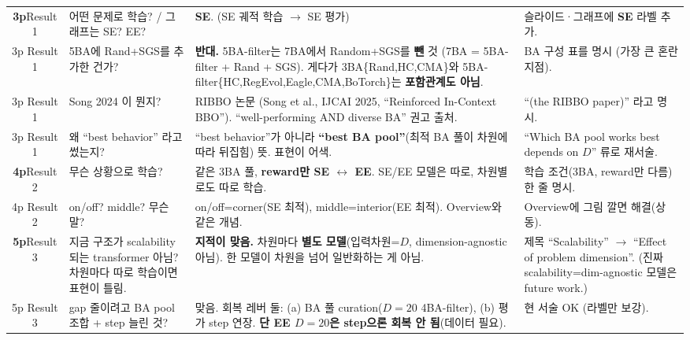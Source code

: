 \documentclass[10pt]{article}
\begin{document}
\begin{longtable}{S Q A F}
\textbf{3p}\newline Result 1 & 어떤 문제로 학습? / 그래프는 SE? EE? & \textbf{SE}. (SE 궤적 학습 $\to$ SE 평가) & 슬라이드·그래프에 \textbf{SE} 라벨 추가. \\
3p Result 1 & 5BA에 Rand+SGS를 추가한 건가? & \textcolor{flag}{\textbf{반대.}} 5BA-filter는 7BA에서 Random+SGS를 \textbf{뺀} 것 (7BA = 5BA-filter + Rand + SGS). 게다가 3BA\{Rand,HC,CMA\}와 5BA-filter\{HC,RegEvol,Eagle,CMA,BoTorch\}는 \textbf{포함관계도 아님}. & \textcolor{flag}{BA 구성 표를 명시} (가장 큰 혼란 지점). \\
3p Result 1 & Song 2024 이 뭔지? & RIBBO 논문 (Song et al., IJCAI 2025, ``Reinforced In-Context BBO''). ``well-performing AND diverse BA'' 권고 출처. & ``(the RIBBO paper)'' 라고 명시. \\
3p Result 1 & 왜 ``best behavior'' 라고 썼는지? & ``best behavior''가 아니라 \textbf{``best BA pool''}(최적 BA 풀이 차원에 따라 뒤집힘) 뜻. 표현이 어색. & ``Which BA pool works best depends on $D$'' 류로 재서술. \\
\midrule

\textbf{4p}\newline Result 2 & 무슨 상황으로 학습? & 같은 3BA 풀, \textbf{reward만 SE $\leftrightarrow$ EE}. SE/EE 모델은 따로, 차원별로도 따로 학습. & 학습 조건(3BA, reward만 다름) 한 줄 명시. \\
4p Result 2 & on/off? middle? 무슨 말? & on/off=corner(SE 최적), middle=interior(EE 최적). Overview와 같은 개념. & Overview에 그림 깔면 해결(상동). \\
\midrule

\textbf{5p}\newline Result 3 & 지금 구조가 scalability 되는 transformer 아님? 차원마다 따로 학습이면 표현이 틀림. & \textcolor{flag}{\textbf{지적이 맞음.}} 차원마다 \textbf{별도 모델}(입력차원=$D$, dimension-agnostic 아님). 한 모델이 차원을 넘어 일반화하는 게 아님. & \textcolor{flag}{제목 ``Scalability'' $\to$ ``Effect of problem dimension''}. (진짜 scalability=dim-agnostic 모델은 future work.) \\
5p Result 3 & gap 줄이려고 BA pool 조합 + step 늘린 것? & 맞음. 회복 레버 둘: (a) BA 풀 curation($D{=}20$ 4BA-filter), (b) 평가 step 연장. \textbf{단 EE $D{=}20$은 step으론 회복 안 됨}(데이터 필요). & 현 서술 OK (라벨만 보강). \\
\midrule


\end{longtable}
\end{document}
